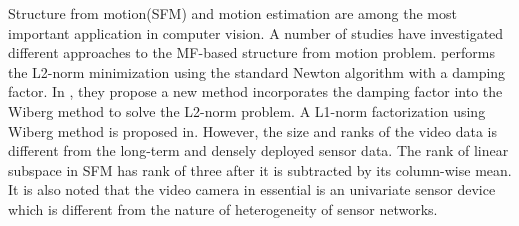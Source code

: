Structure from motion(SFM)\cite{tomasi1992shape} and motion estimation are among the most important application in computer vision.   
A number of studies have investigated different approaches to the MF-based structure from motion problem. \cite{buchanan2005damped} performs the L2-norm minimization using the standard Newton algorithm with a damping factor. In \cite{okatani2011efficient}, they propose a new method incorporates the damping factor into the Wiberg method to solve the L2-norm problem. A L1-norm factorization using Wiberg method is proposed in\cite{eriksson2010efficient}. 
However, the size and ranks of the video data is different from the long-term and densely deployed sensor data. 
The rank of linear subspace in SFM has rank of three after it is subtracted by its column-wise mean. It is also noted that the video camera in essential is an univariate sensor device which is different from the nature of heterogeneity of sensor networks. 